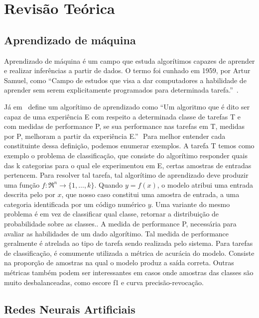\section{Revisão Teórica}\label{sec:Cap2_revisao_teorica}

\subsection{Aprendizado de máquina}\label{sec:aprendizado_maquina}

Aprendizado de máquina é um campo que estuda algorítimos capazes de aprender e realizar
inferências a partir de dados. O termo foi cunhado em 1959, por Artur Samuel, como “Campo
de estudos que visa a dar computadores a habilidade de aprender sem serem explicitamente
programados para determinada tarefa.”~\cite{Samuel1959SomeSI}.

Já em~\cite{Mitchell97} define um algorítimo de aprendizado como “Um algoritmo que é dito
ser capaz de uma experiência E com respeito a determinada classe de tarefas T e com
medidas de performance P, se sua performance nas tarefas em T, medidas por P, melhoram a
partir da experiência E.”
\( \)
Para melhor entender cada constituinte dessa definição, podemos enumerar exemplos. A
tarefa T temos como exemplo o problema de classificação, que consiste do algorítimo
responder quais das k categorias para o qual ele experimentou em E, certas amostras de
entradas pertencem. Para resolver tal tarefa, tal algorítimo de aprendizado deve produzir
uma função \(f:\Re^n\rightarrow \{1,\ldots,k\}\). Quando \(y=f(x)\), o modelo atribui uma
entrada descrita pelo por \(x\), que nosso caso constitui uma amostra de entrada, a uma
categoria identificada por um código numérico \(y\). Uma variante do mesmo problema é em
vez de classificar qual classe, retornar a distribuição de probabilidade sobre as
classes.\cite{GoodBengCour16}. A medida de performance P, necessária para avaliar as
habilidades de um dado algorítimo. Tal medida de performance geralmente é atrelada ao tipo
de tarefa sendo realizada pelo sistema. Para tarefas de classificação, é comumente
utilizada a métrica de acurácia do modelo. Consiste na proporção de amostras na qual o
modelo produz a saída correta. Outras métricas também podem ser interessantes em casos
onde amostras das classes são muito desbalanceadas, como escore f1 e curva
precisão-revocação.


\subsection{Redes Neurais Artificiais}\label{sec:Cap2_redes_neurais}

